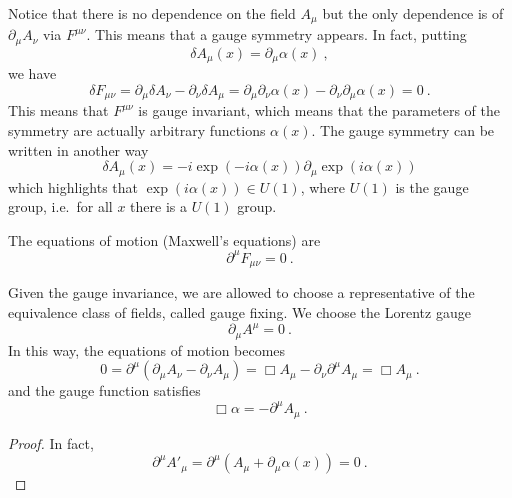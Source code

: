     Notice that there is no dependence on the field $A_\mu$ but the only dependence is of $\partial_\mu A_\nu$ via $F^{\mu\nu}$. This means that a gauge symmetry appears. In fact, putting 
    \begin{equation*}
        \delta A_\mu (x) = \partial_\mu \alpha(x) ~,
    \end{equation*}
    we have 
    \begin{equation*}
        \delta F_{\mu\nu} = \partial_\mu \delta A_\nu - \partial_\nu \delta A_\mu = \partial_\mu \partial_\nu \alpha (x) - \partial_\nu \partial_\mu \alpha (x) = 0 ~.
    \end{equation*}
    This means that $F^{\mu\nu}$ is gauge invariant, which means that the parameters of the symmetry are actually arbitrary functions $\alpha (x)$. The gauge symmetry can be written in another way 
    \begin{equation*}
        \delta A_\mu (x) = - i \exp(-i \alpha(x)) \partial_\mu \exp(i \alpha (x))
    \end{equation*}
    which highlights that $\exp(i \alpha(x)) \in U(1)$, where $U(1)$ is the gauge group, i.e.~for all $x$ there is a $U(1)$ group.

    The equations of motion (Maxwell's equations) are 
    \begin{equation*}
        \partial^\mu F_{\mu\nu} = 0 ~.
    \end{equation*}

    Given the gauge invariance, we are allowed to choose a representative of the equivalence class of fields, called gauge fixing. We choose the Lorentz gauge 
    \begin{equation*}
        \partial_\mu A^\mu = 0 ~.
    \end{equation*}
    In this way, the equations of motion becomes 
    \begin{equation*}
        0 = \partial^\mu (\partial_\mu A_\nu - \partial_\nu A_\mu) = \Box A_\mu - \partial_\nu \partial^\mu A_\mu = \Box A_\mu ~.
    \end{equation*}
    and the gauge function satisfies 
    \begin{equation*}
        \Box \alpha = - \partial^\mu A_\mu ~.
    \end{equation*}
    \begin{proof}
        In fact,
        \begin{equation*}
            \partial^\mu {A'}_\mu = \partial^\mu (A_\mu + \partial_\mu \alpha (x)) = 0 ~.
        \end{equation*}
    \end{proof}

